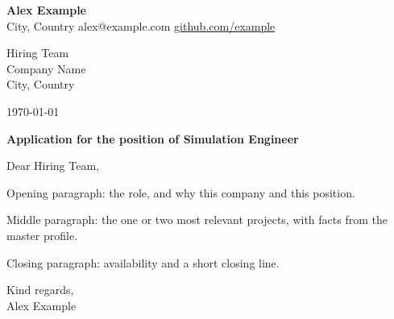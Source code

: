 \documentclass[11pt]{article}
\begin{document}
{\Large\bfseries Alex Example}\\
City, Country \textbullet{} alex@example.com \textbullet{} \href{https://github.com/example}{github.com/example}

\vspace{12pt}
Hiring Team\\
Company Name\\
City, Country

\vspace{6pt}
\today

\textbf{Application for the position of Simulation Engineer}

Dear Hiring Team,

Opening paragraph: the role, and why this company and this position.

Middle paragraph: the one or two most relevant projects, with facts from the master profile.

Closing paragraph: availability and a short closing line.

Kind regards,\\[18pt]
Alex Example
\end{document}
